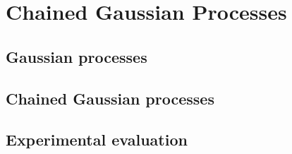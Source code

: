 \chapter{Chained Gaussian Processes}\label{ch:chained_gps}

\section{Gaussian processes}

\section{Chained Gaussian processes}

\section{Experimental evaluation}